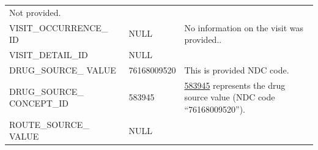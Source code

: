 \documentclass[10.5pt]{book}
\theoremstyle{definition}
\theoremstyle{definition}
\theoremstyle{definition}
\theoremstyle{remark}
\begin{document}
\begin{longtable}[]{@{}lll@{}}
\begin{minipage}[t]{0.48\columnwidth}
Not provided.\strut
\end{minipage}\tabularnewline
\begin{minipage}[t]{0.28\columnwidth}\raggedright\strut
VISIT\_OCCURRENCE\_ ID\strut
\end{minipage} & \begin{minipage}[t]{0.16\columnwidth}\raggedright\strut
NULL\strut
\end{minipage} & \begin{minipage}[t]{0.48\columnwidth}\raggedright\strut
No information on the visit was provided..\strut
\end{minipage}\tabularnewline
\begin{minipage}[t]{0.28\columnwidth}\raggedright\strut
VISIT\_DETAIL\_ID\strut
\end{minipage} & \begin{minipage}[t]{0.16\columnwidth}\raggedright\strut
NULL\strut
\end{minipage} & \begin{minipage}[t]{0.48\columnwidth}\raggedright\strut
\strut
\end{minipage}\tabularnewline
\begin{minipage}[t]{0.28\columnwidth}\raggedright\strut
DRUG\_SOURCE\_ VALUE\strut
\end{minipage} & \begin{minipage}[t]{0.16\columnwidth}\raggedright\strut
76168009520\strut
\end{minipage} & \begin{minipage}[t]{0.48\columnwidth}\raggedright\strut
This is provided NDC code.\strut
\end{minipage}\tabularnewline
\begin{minipage}[t]{0.28\columnwidth}\raggedright\strut
DRUG\_SOURCE\_ CONCEPT\_ID\strut
\end{minipage} & \begin{minipage}[t]{0.16\columnwidth}\raggedright\strut
583945\strut
\end{minipage} & \begin{minipage}[t]{0.48\columnwidth}\raggedright\strut
\href{http://athena.ohdsi.org/search-terms/terms/750264}{583945}
represents the drug source value (NDC code ``76168009520'').\strut
\end{minipage}\tabularnewline
\begin{minipage}[t]{0.28\columnwidth}\raggedright\strut
ROUTE\_SOURCE\_ VALUE\strut
\end{minipage} & \begin{minipage}[t]{0.16\columnwidth}\raggedright\strut
NULL\strut
\end{minipage} & \begin{minipage}[t]{0.48\columnwidth}\raggedright\strut
\strut
\end{minipage}\tabularnewline
\bottomrule
\end{longtable}
\end{document}
